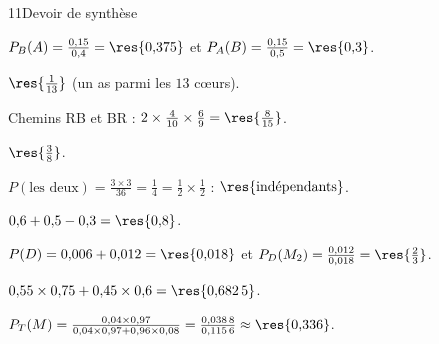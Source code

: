 \begin{corrige}{11}{Devoir de synthèse}
\begin{questions}
  \item $P_B(A)=\frac{0{,}15}{0{,}4}=\res{0{,}375}$ et $P_A(B)=\frac{0{,}15}{0{,}5}=\res{0{,}3}$.
  \item $\res{\frac{1}{13}}$ (un as parmi les $13$ cœurs).
  \item Chemins RB et BR : $2\times\frac{4}{10}\times\frac69=\res{\frac{8}{15}}$.
  \item $\res{\frac38}$.
  \item $P(\text{les deux})=\frac{3\times3}{36}=\frac14=\frac12\times\frac12$ : $\res{\text{indépendants}}$.
  \item $0{,}6+0{,}5-0{,}3=\res{0{,}8}$.
  \item $P(D)=0{,}006+0{,}012=\res{0{,}018}$ et $P_D(M_2)=\frac{0{,}012}{0{,}018}=\res{\frac23}$.
  \item $0{,}55\times0{,}75+0{,}45\times0{,}6=\res{0{,}682\,5}$.
  \item $P_T(M)=\frac{0{,}04\times0{,}97}{0{,}04\times0{,}97+0{,}96\times0{,}08}=\frac{0{,}038\,8}{0{,}115\,6}\approx\res{0{,}336}$.
\end{questions}
\end{corrige}

